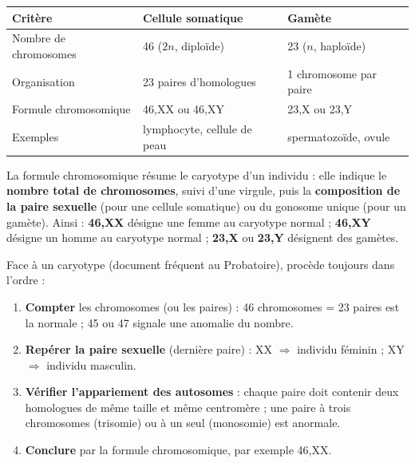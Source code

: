 \documentclass[11pt]{article}
\newcommand{\cle}[1]{{\popxbold\color{popdark}#1}}
\begin{document}
\begin{center}
\begin{tabularx}{\linewidth}{|l|X|X|}
\hline
\rowcolor{popblueL} \textbf{Critère} & \textbf{Cellule somatique} & \textbf{Gamète} \\
\hline
Nombre de chromosomes & 46 ($2n$, diploïde) & 23 ($n$, haploïde) \\
\hline
Organisation & 23 paires d'homologues & 1 chromosome par paire \\
\hline
Formule chromosomique & 46,XX ou 46,XY & 23,X ou 23,Y \\
\hline
Exemples & lymphocyte, cellule de peau & spermatozoïde, ovule \\
\hline
\end{tabularx}
\end{center}

\begin{definition}
La \cle{formule chromosomique} résume le caryotype d'un individu : elle indique le \textbf{nombre total de chromosomes}, suivi d'une virgule, puis la \textbf{composition de la paire sexuelle} (pour une cellule somatique) ou du gonosome unique (pour un gamète). Ainsi : \textbf{46,XX} désigne une femme au caryotype normal ; \textbf{46,XY} désigne un homme au caryotype normal ; \textbf{23,X} ou \textbf{23,Y} désignent des gamètes.
\end{definition}

\begin{methode}
Face à un caryotype (document fréquent au Probatoire), procède toujours dans l'ordre :
\begin{enumerate}
\item \textbf{Compter} les chromosomes (ou les paires) : 46 chromosomes = 23 paires est la normale ; 45 ou 47 signale une anomalie du nombre.
\item \textbf{Repérer la paire sexuelle} (dernière paire) : XX $\Rightarrow$ individu féminin ; XY $\Rightarrow$ individu masculin.
\item \textbf{Vérifier l'appariement des autosomes} : chaque paire doit contenir deux homologues de même taille et même centromère ; une paire à trois chromosomes (trisomie) ou à un seul (monosomie) est anormale.
\item \textbf{Conclure} par la formule chromosomique, par exemple 46,XX.
\end{enumerate}
\end{methode}
\end{document}

